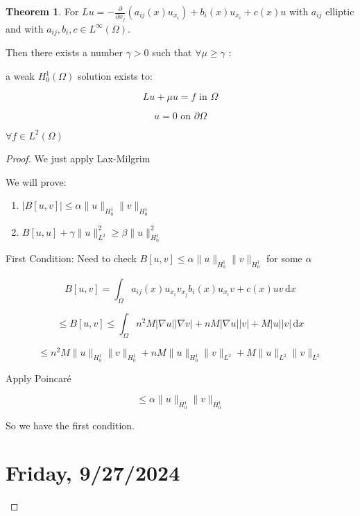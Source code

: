 \documentclass{article}
\theoremstyle{definition}
\newtheorem{theorem}{Theorem}
\begin{document}
\begin{theorem}
    For \(L u = - \frac{\partial}{\partial x_j} (a_{ij}(x) u_{x_i}) + b_i(x) u_{x_i}+c(x)u\) with \(a_{ij}\) elliptic and with \(a_{ij}, b_i, c\in L^{\infty}(\Omega)\).

    Then there exists a number \(\gamma > 0\) such that \(\forall \mu \geq \gamma\) :

    a weak \(H^1_0(\Omega)\) solution exists to:

    \[
        Lu + \mu u = f \text{ in } \Omega
    \]

    \[
        u = 0 \text{ on } \partial \Omega 
    \]

    \(\forall f\in L^2(\Omega)\) 
\end{theorem}

\begin{proof}
    We just apply Lax-Milgrim

    We will prove:

    \begin{enumerate}[label=\roman*)]
        \item \(\vert B[u,v] \vert \leq \alpha \lVert u \rVert _{H^1_0} \lVert v \rVert _{H^1_0}\)
        \item \(B[u,u] + \gamma \lVert u \rVert ^2_{L^2} \geq \beta \lVert u \rVert _{H^1_0}^2\)   
    \end{enumerate} 

    First Condition: Need to check \(B[u,v] \leq \alpha \lVert u \rVert _{H^1_0} \lVert v \rVert _{H^1_0}\) for some \(\alpha\) 

    \[
        B[u,v] = \int_{\Omega}^{} a_{ij}(x) u_{x_i}v_{x_j} b_i(x) u_{x_i} v + c(x) uv \,\mathrm{d}x 
    \]

    \[
        \leq B[u,v] \leq \int_{\Omega}^{} n^2M \vert \nabla u \vert \vert \nabla v \vert + nM \vert \nabla u \vert \vert v \vert + M \vert u \vert \vert v \vert  \,\mathrm{d}x 
    \]

    \[
        \leq n^2 M \lVert u \rVert _{H^1_0} \lVert v \rVert _{H^1_0} + nM \lVert u \rVert _{H^1_0} \lVert v \rVert _{L^2} + M \lVert u \rVert _{L^2} \lVert v \rVert _{L^2}
    \]


    Apply Poincar\'e

    \[
        \leq \alpha \lVert u \rVert _{H^1_0} \lVert v \rVert _{H^1_0}
    \]

    So we have the first condition.

\section*{Friday, 9/27/2024}


\end{proof}
\end{document}
